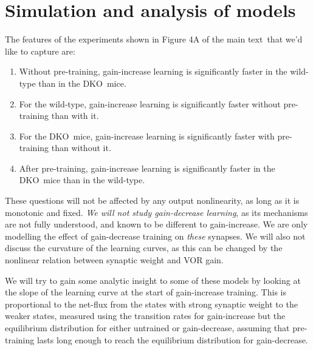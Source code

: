 \documentclass[10pt]{article}
\newcommand{\KO}{DKO}
\newcommand{\modelfig}[1][A]{Figure 4#1 of the main text}
\begin{document}




\section{Simulation and analysis of models}\label{sec:results}

The features of the experiments shown in \modelfig\ that we'd like to capture are:
%
\begin{enumerate}
  \item Without pre-training, gain-increase learning is significantly faster in the wild-type than in the \KO\ mice.
  \item For the wild-type, gain-increase learning is significantly faster without pre-training than with it.
  \item For the \KO\ mice, gain-increase learning is significantly faster with pre-training than without it.
  \item After pre-training, gain-increase learning is significantly faster in the \KO\ mice than in the wild-type.
\end{enumerate}
%
These questions will not be affected by any output nonlinearity, as long as it is monotonic and fixed.
\emph{We will not study gain-decrease learning}, as its mechanisms are not fully understood, and known to be different to gain-increase.
We are only modelling the effect of gain-decrease training on \emph{these} synapses.
We will also not discuss the curvature of the learning curves, as this can be changed by the nonlinear relation between synaptic weight and VOR gain.

We will try to gain some analytic insight to some of these models by looking at the slope of the learning curve at the start of gain-increase training.
This is proportional to the net-flux from the states with strong synaptic weight to the weaker states, measured using the transition rates for gain-increase but the equilibrium distribution for either untrained or gain-decrease, assuming that pre-training lasts long enough to reach the equilibrium distribution for gain-decrease.
\end{document}
